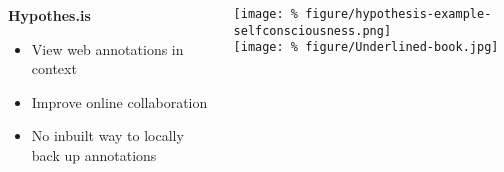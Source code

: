 \documentclass[unknownkeysallowed,usepdftitle=false, parskip=full]{beamer}
\newcommand{\secvariable}{nothing}
\newcommand{\mysection}[1]{\renewcommand{\secvariable}{#1}
}
\begin{document}
\mysection{radar}
\begin{frame}\label{\secvariable}
  \begin{columns}[t]
    \begin{column}[c]{0.45\textwidth}
    \parbox{\linewidth}{

\textbf{Hypothes.is}

      \vspace{12pt}
     
\begin{itemize}
\item View web annotations in context
\item Improve online collaboration
\end{itemize}

  \vspace{12pt}
  
\begin{itemize}
\item No inbuilt way to locally back up annotations
\end{itemize}

      }
    \end{column}
    \begin{column}[c]{0.6\textwidth}
\texttt{[image: \%
figure/hypothesis-example-selfconsciousness.png]}\\
\vspace{12pt}
\texttt{[image: \%
figure/Underlined-book.jpg]}
    \end{column}
  \end{columns}

  
\end{frame}
\end{document}
